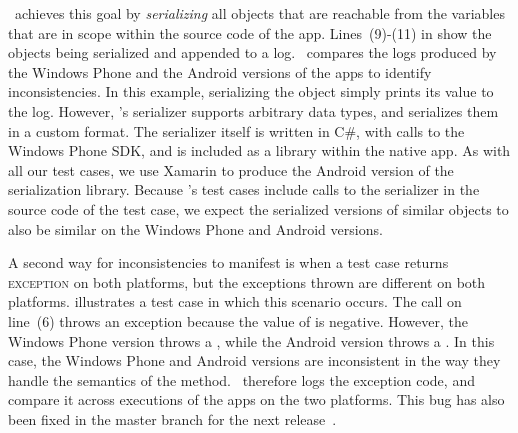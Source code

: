 \tool\ achieves this goal by \textit{serializing} all objects that are
reachable from the variables that are in scope within the source code of the
app. Lines~(9)-(11) in  show the objects being
serialized and appended to a log.  \tool\ compares the logs produced by the
Windows Phone and the Android versions of the apps to identify inconsistencies.
In this example, serializing the  object simply prints its value
to the log. However, \tool's serializer supports arbitrary data types, and
serializes them in a custom format. The serializer itself is written in C\#,
with calls to the Windows Phone SDK, and is included as a library within the
native app. As with all our test cases, we use Xamarin to produce the Android
version of the serialization library. Because \tool's test cases include calls
to the serializer in the source code of the test case, we expect the serialized
versions of similar objects to also be similar on the Windows Phone and Android
versions.

A second way for inconsistencies to manifest is when a test case returns
\textsc{exception} on both platforms, but the exceptions thrown are different
on both platforms.   illustrates a test case in
which this scenario occurs. The call on line~(6) throws an exception because
the value of  is negative. However, the Windows Phone version
throws a , while the Android version
throws a . In this case, the Windows
Phone and Android versions are inconsistent in the way they handle the
semantics of the  method. \tool\ therefore logs the
exception code, and compare it across executions of the apps on the two
platforms. This bug has also been
fixed in the master branch for the next release~\cite{xam:bzil:25895}.

